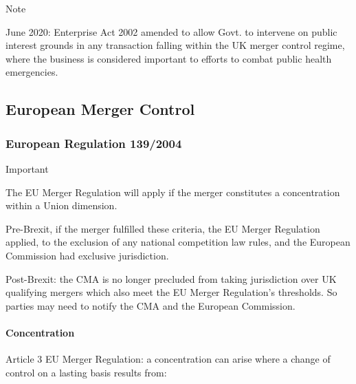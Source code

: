 \documentclass[
]{article}
\newenvironment{env-50f656db-1019-4ecb-abbd-eb2993c53735}
{
    \savenotes\tcolorbox[blanker,breakable,left=5pt,borderline west={2pt}{-4pt}{blue}]
}
{
    \endtcolorbox\spewnotes
}
\newenvironment{env-d2bd2e68-cd24-4923-bb6f-ad1027a637df}
{
    \savenotes\tcolorbox[blanker,breakable,left=5pt,borderline west={2pt}{-4pt}{cyan}]
}
{
    \endtcolorbox\spewnotes
}
\begin{document}
\begin{env-50f656db-1019-4ecb-abbd-eb2993c53735}

Note

June 2020: Enterprise Act 2002 amended to allow Govt. to intervene on
public interest grounds in any transaction falling within the UK merger
control regime, where the business is considered important to efforts to
combat public health emergencies.

\end{env-50f656db-1019-4ecb-abbd-eb2993c53735}

\hypertarget{european-merger-control}{%
\subsection{European Merger Control}\label{european-merger-control}}

\hypertarget{european-regulation-1392004}{%
\subsubsection{European Regulation
139/2004}\label{european-regulation-1392004}}

\begin{env-d2bd2e68-cd24-4923-bb6f-ad1027a637df}

Important

The EU Merger Regulation will apply if the merger constitutes a
concentration within a Union dimension.

\end{env-d2bd2e68-cd24-4923-bb6f-ad1027a637df}

Pre-Brexit, if the merger fulfilled these criteria, the EU Merger
Regulation applied, to the exclusion of any national competition law
rules, and the European Commission had exclusive jurisdiction.

Post-Brexit: the CMA is no longer precluded from taking jurisdiction
over UK qualifying mergers which also meet the EU Merger Regulation's
thresholds. So parties may need to notify the CMA and the European
Commission.

\hypertarget{concentration}{%
\paragraph{Concentration}\label{concentration}}

Article 3 EU Merger Regulation: a concentration can arise where a change
of control on a lasting basis results from:
\end{document}
